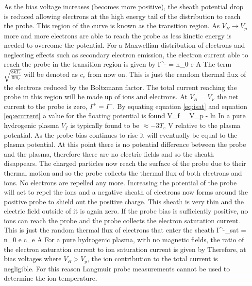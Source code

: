 As the bias voltage increases (becomes more positive), the sheath potential drop is reduced allowing electrons at the high energy tail of the distribution to reach the probe. This region of the curve is known as the transition region. As $V_B \to V_{p}$ more and more electrons are able to reach the probe as less kinetic energy is needed to overcome the potential. For a Maxwellian distribution of electrons and neglecting effects such as secondary electron emission, the electron current able to reach the probe in the transition region is given by 
\be  
I^{-} =  n_0 e A   \exp{}
\label{eq:ecurrent}
\ee
The term $\sqrt{\frac{8 k T_e}{\pi m_e}}$ will be denoted as $c_e$ from now on. This is just the random thermal flux of the electrons reduced by the Boltzmann factor. The total current reaching the probe in this region will be made up of ions and electrons. At $V_B$ = $V_F$ the net current to the probe is zero, $I^+ = I^-$. By equating equation \eqref{eq:isat} and equation \eqref{eq:ecurrent} a value for the floating potential is found
\be 
V_f = V_{p} -  ln
\label{eq:floating}
\ee
In a pure hydrogenic plasma $V_f$ is typically found to be $\approx -3T_e $ V relative to the plasma potential.            %
As the probe bias continues to rise it will eventually be equal to the plasma potential. At this point there is no potential difference between the probe and the plasma, therefore there are no electric fields and so the sheath disappears. The charged particles now reach the surface of the probe due to their thermal motion and so the probe collects the thermal flux of both electrons and ions. No electrons are repelled any more. Increasing the potential of the probe will act to repel the ions and a negative sheath of electrons now forms around the positive probe to shield out the positive charge. This sheath is very thin and the electric field outside of it is again zero. If the probe bias is sufficiently positive, no ions can reach the probe and the probe collects the electron saturation current. This is just the random thermal flux of electrons that enter the sheath
\be  
I^{-}_{sat} =  n_0 e c_e A
\label{eq:esat}
\ee
For a pure hydrogenic plasma, with no magnetic fields, the ratio of the electron saturation current to ion saturation current is given by
\be 
{} 
\ee
Therefore, at bias voltages where $V_B > V_{p}$, the ion contribution to the total current is negligible. For this reason Langmuir probe measurements cannot be used to determine the ion temperature. %

